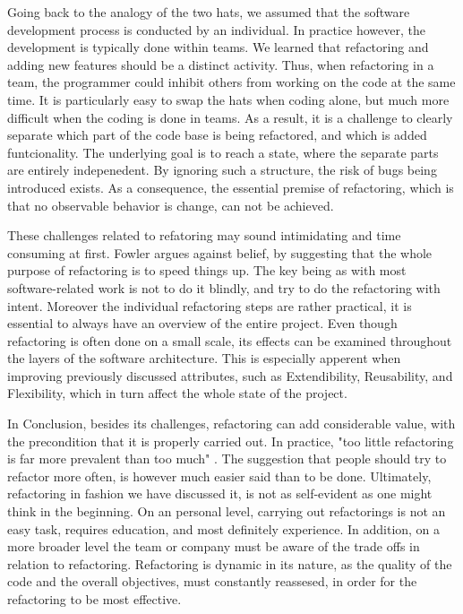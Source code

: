 Going back to the analogy of the two hats, 
	we assumed that the software development process 
	is conducted by an individual. 
In practice however, 
	the development is typically done within teams. 
We learned that refactoring and adding new features 
	should be a distinct activity. 
Thus, when refactoring in a team,
	the programmer could inhibit others from working on the code 
	at the same time. 
It is particularly easy to swap the hats when coding alone, 
	but much more difficult when the coding is done in teams. 
As a result, 
	it is a challenge to clearly separate 
	which part of the code base is being refactored, 
	and which is added funtcionality. 
The underlying goal is to reach a state,
	where the separate parts are entirely indepenedent. 
By ignoring such a structure, 
	the risk of bugs being introduced exists. 
As a consequence, 
	the essential premise of refactoring, 
	which is that no observable behavior is change, 
	can not be achieved.

These challenges related to refatoring 
	may sound intimidating and time consuming at first.
Fowler \textcite[p.~56]{fowler2018} argues against belief,
	by suggesting that the whole purpose of refactoring 
	is to speed things up.
The key being as with most software-related work is not to do it blindly, 
	and try to do the refactoring with intent.
Moreover the individual refactoring steps are rather practical,
	it is essential to always have an overview of the entire project.
Even though refactoring is often done on a small scale,
	its effects can be examined 
	throughout the layers of the software architecture.
This is especially apperent when improving previously discussed attributes,
	such as Extendibility, Reusability, and Flexibility, 
	which in turn affect the whole state of the project. 

	
In Conclusion, besides its challenges, 
	refactoring can add considerable value, 
	with the precondition that it is properly carried out.
In practice, 
	"too little refactoring is far more prevalent than too much" 
	\cite[p.56]{fowler2018}.
The suggestion that people should try to refactor more often, 
	is however much easier said than to be done.
Ultimately, refactoring in fashion we have discussed it, 
	is not as self-evident as one might think in the beginning.
On an personal level, carrying out refactorings is not an easy task, 
	requires education, and most definitely experience.
In addition, on a more broader level the team or company must be aware of the trade offs in relation to refactoring. 
Refactoring is dynamic in its nature,
	as the quality of the code and the overall objectives,
	must constantly reassesed,
	in order for the refactoring to be most effective.

